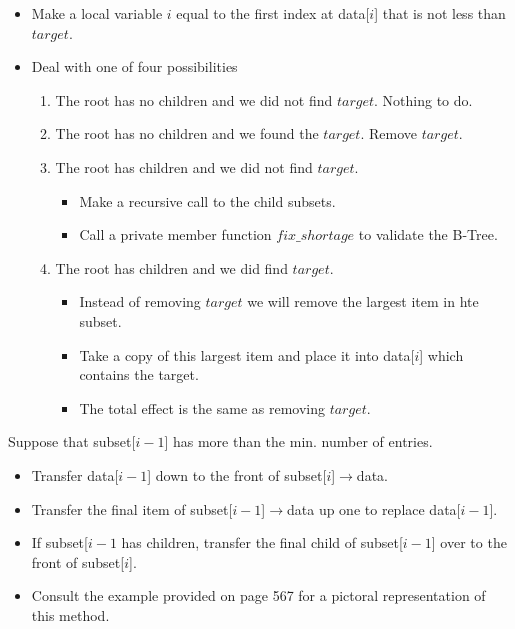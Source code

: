 \begin{itemize}
\item Make a local variable $i$ equal to the first index at data[$i$] that is not less than $target$.
\item Deal with one of four possibilities
\begin{enumerate}
    \item The root has no children and we did not find $target$. Nothing to do.
    \item The root has no children and we found the $target$. Remove $target$.
    \item The root has children and we did not find $target$.
        \begin{itemize}
            \item Make a recursive call to the child subsets.
            \item Call a private member function $fix\_shortage$ to  validate the B-Tree.
        \end{itemize}
    \item The root has children and we did find $target$.
        \begin{itemize}
            \item Instead of removing $target$ we will remove the largest item in hte subset.
            \item Take a copy of this largest item and place it into data[$i$] which contains the target.
            \item The total effect is the same as removing $target$.
        \end{itemize}
\end{enumerate}
\end{itemize}
\begin{example}
Suppose that subset[$i-1$] has more than the min. number of entries.
\begin{itemize}
\item Transfer data[$i-1$] down to the front of subset[$i$]$\to$data.
\item Transfer the final item of subset[$i-1$]$\to$data up one to replace data[$i-1$].
\item If subset[$i-1$ has children, transfer the final child of subset[$i-1$] over to the front of subset[$i$].
\item Consult the example provided on page 567 for a pictoral representation of this method.
\end{itemize}
\end{example}
